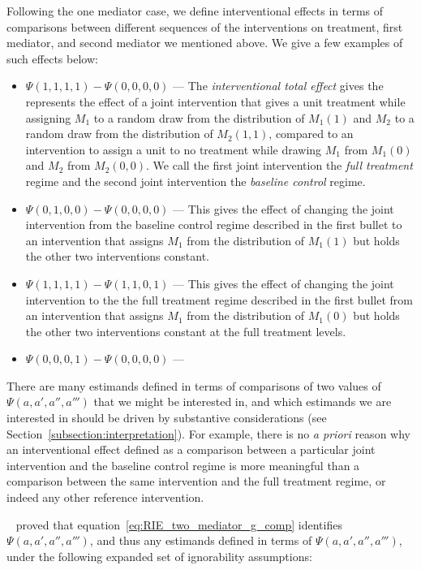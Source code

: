 Following the one mediator case, we define interventional effects in terms of comparisons between different 
sequences of the interventions on treatment, first mediator, and second mediator we mentioned above. We
give a few examples of such effects below: 

\begin{itemize}[noitemsep,topsep=0pt]
	\item $\Psi(1,1,1,1) - \Psi(0,0,0,0)$ --- The \textit{interventional total effect} gives the 
	represents the effect of a joint intervention that gives a unit treatment while assigning $M_{1}$
	to a random draw from the distribution of $M_{1}(1)$ and $M_{2}$ to 
	a random draw from the distribution of $M_{2}(1,1)$, compared to an intervention
	to assign a unit to no treatment while drawing $M_{1}$ from $M_{1}(0)$ and $M_{2}$ from $M_{2}(0,0)$. We 
	call the first joint intervention the \textit{full treatment} regime and the second joint intervention the 
	\textit{baseline control} regime. 
	\item $\Psi(0,1,0,0) - \Psi(0,0,0,0)$ --- This gives the effect of changing the joint intervention from
	the baseline control regime described in the first bullet to an intervention that assigns $M_{1}$ 
	from the distribution of $M_{1}(1)$ but holds the other two interventions constant. 
	\item $\Psi(1,1,1,1) - \Psi(1,1,0,1)$ --- This gives the effect of changing the joint intervention to the
	the full treatment regime described in the first bullet from an intervention that assigns $M_{1}$ 
	from the distribution of $M_{1}(0)$ but holds the other two interventions constant at the full treatment
	levels. 
	\item $\Psi(0,0,0,1) - \Psi(0,0,0,0)$ --- 
\end{itemize}

There are many estimands defined in terms of comparisons of two values of $\Psi(a,a',a'',a''')$ that we might
be interested in, and which estimands we are interested in should
be driven by substantive considerations (see Section~\ref{subsection:interpretation}). For example, 
there is no \textit{a priori} reason why an interventional effect defined as a comparison between a
particular joint intervention and the baseline control regime is more meaningful than a comparison between
the same intervention and the full treatment regime, or indeed any other reference intervention. 

~\cite{linvanderweele2017} proved that equation~\ref{eq:RIE_two_mediator_g_comp} identifies 
$\Psi(a,a',a'',a''')$, and thus any estimands defined in terms of $\Psi(a,a',a'',a''')$, 
under the following expanded set of ignorability assumptions: 

